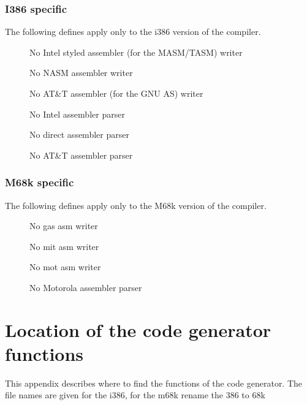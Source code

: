 \documentclass{report}
\begin{document}
\subsection{I386 specific}
The following defines apply only to the i386 version of the compiler.

\begin{description}
 \item[] No Intel styled assembler (for the MASM/TASM) writer
 \item[] No NASM assembler writer
 \item[] No AT\&T assembler (for the GNU AS) writer
 \item[] No Intel assembler parser
 \item[] No direct assembler parser
 \item[] No AT\&T assembler parser
\end{description}

\subsection{M68k specific}
The following defines apply only to the M68k version of the compiler.

\begin{description}
 \item[] No gas asm writer
 \item[] No mit asm writer
 \item[] No mot asm writer
 \item[] No Motorola assembler parser
\end{description}

\chapter{Location of the code generator functions}

This appendix describes where to find the functions of
the code generator. The file names are given for the
i386, for the m68k rename the 386 to 68k
\end{document}
